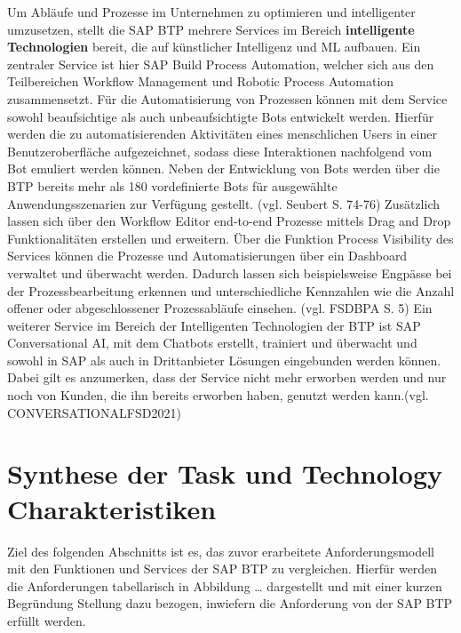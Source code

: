 Um Abläufe und Prozesse im Unternehmen zu optimieren und intelligenter umzusetzen, stellt die SAP BTP mehrere Services im Bereich \textbf{intelligente Technologien} bereit, die auf künstlicher Intelligenz und ML aufbauen.  Ein zentraler Service ist hier SAP Build Process Automation, welcher sich aus den Teilbereichen Workflow Management und Robotic Process Automation zusammensetzt. Für die Automatisierung von Prozessen können mit dem Service sowohl beaufsichtige als auch unbeaufsichtigte Bots entwickelt werden. Hierfür werden die zu automatisierenden Aktivitäten eines menschlichen Users in einer Benutzeroberfläche aufgezeichnet, sodass diese Interaktionen nachfolgend vom Bot emuliert werden können. Neben der Entwicklung von Bots werden über die BTP bereits mehr als 180 vordefinierte Bots für ausgewählte Anwendungsszenarien zur Verfügung gestellt. (vgl. Seubert S. 74-76) Zusätzlich lassen sich über den Workflow Editor end-to-end Prozesse mittels Drag and Drop Funktionalitäten erstellen und erweitern. Über die Funktion Process Visibility des Services können die Prozesse und Automatisierungen über ein Dashboard verwaltet und überwacht werden. Dadurch lassen sich beispielsweise Engpässe bei der Prozessbearbeitung erkennen und unterschiedliche Kennzahlen wie die Anzahl offener oder abgeschlossener Prozessabläufe einsehen. (vgl. FSDBPA S. 5)
Ein weiterer Service im Bereich der Intelligenten Technologien der BTP ist SAP Conversational AI, mit dem Chatbots erstellt, trainiert und überwacht und sowohl in SAP als auch in Drittanbieter Lösungen eingebunden werden können. Dabei gilt es anzumerken, dass der Service nicht mehr erworben werden und nur noch von Kunden, die ihn bereits erworben haben, genutzt werden kann.(vgl. CONVERSATIONALFSD2021)




\section{Synthese der Task und Technology Charakteristiken}

Ziel des folgenden Abschnitts ist es, das zuvor erarbeitete Anforderungsmodell mit den Funktionen und Services der SAP BTP zu vergleichen. Hierfür werden die Anforderungen tabellarisch in Abbildung … dargestellt und mit einer kurzen Begründung Stellung dazu bezogen, inwiefern die Anforderung von der SAP BTP erfüllt werden.

